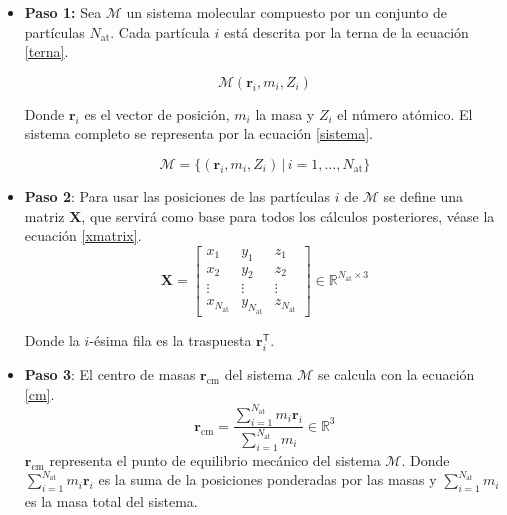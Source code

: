 	\begin{itemize}
		\item \textbf{Paso 1:}
		Sea $\mathcal{M}$ un sistema molecular compuesto por un conjunto de partículas $N_{\text{at}}$. Cada partícula $i$ está descrita por la terna de la ecuación \ref{terna}.
		
		\begin{equation}
			\mathcal{M} (\mathbf{r}_i, m_i, Z_i)
			\label{terna}
		\end{equation}
		
		Donde $\mathbf{r}_i$ es el vector de posición, $m_i$ la masa y $Z_i$ el número atómico. El sistema completo se representa por la ecuación \ref{sistema}.	
		
		\begin{equation}
			\mathcal{M} = \bigl\{(\mathbf{r}_i, m_i, Z_i) \,\big|\, i = 1,\dots,N_{\text{at}}\bigr\}
			\label{sistema}
		\end{equation}
	
		\item \textbf{Paso 2}: Para usar las posiciones de las partículas $i$ de $\mathcal{M}$ se define una matriz $\mathbf{X}$, que servirá como base para todos los cálculos posteriores, véase la ecuación \ref{xmatrix}.
		\begin{equation}
			\mathbf{X} = \begin{bmatrix}
				x_1 & y_1 & z_1 \\
				x_2 & y_2 & z_2 \\
				\vdots & \vdots & \vdots \\
				x_{N_{\text{at}}} & y_{N_{\text{at}}} & z_{N_{\text{at}}}
			\end{bmatrix} \in \mathbb{R}^{N_{\text{at}} \times 3}
			\label{xmatrix}
		\end{equation}
		
		Donde la $i$-ésima fila es la traspuesta $\mathbf{r}_i^{\mathsf T}$.
		
		
		\item \textbf{Paso 3}: El centro de masas $\mathbf{r}_{\text{cm}}$ del sistema $\mathcal{M}$ se calcula con la ecuación \ref{cm}.
		\begin{equation}
			\mathbf{r}_{\text{cm}}
			= \frac{\displaystyle \sum_{i=1}^{N_{\text{at}}} m_i \mathbf{r}_i}
			{\displaystyle \sum_{i=1}^{N_{\text{at}}} m_i}
			\in \mathbb{R}^3
			\label{cm}
		\end{equation}
		$\mathbf{r}_{\text{cm}}$ representa el punto de equilibrio mecánico del sistema $\mathcal{M}$. 
		Donde $\displaystyle \sum_{i=1}^{N_{\text{at}}} m_i \mathbf{r}_i$ es la suma de la posiciones ponderadas por las masas y $\displaystyle \sum_{i=1}^{N_{\text{at}}} m_i$ es la masa total del sistema.
		

\end{itemize}
